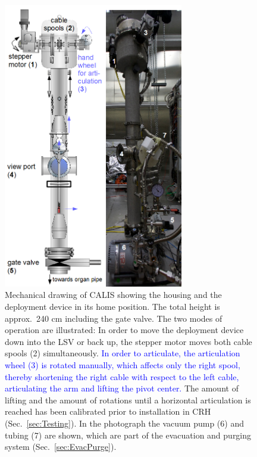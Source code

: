 \begin{figure}[htbp]
 \centering
\includegraphics[width=0.7\textwidth]{Figures/CALIS_overview.png}
 \caption{Mechanical drawing of CALIS showing the housing and the deployment device in its home position. The total height is approx.~240 cm including the gate valve. The two modes of operation are illustrated: In order to move the deployment device down into the LSV or back up, the stepper motor moves both cable spools (2) simultaneously. \textcolor{blue}{In order to articulate, the articulation wheel (3) is rotated manually, which affects only the right spool, thereby shortening the right cable with respect to the left cable, articulating the arm and lifting the pivot center.} The amount of lifting and the amount of rotations until a horizontal articulation is reached has been calibrated prior to installation in CRH (Sec.~\ref{sec:Testing}). In the photograph the vacuum pump (6) and tubing (7) are shown, which are part of the evacuation and purging system (Sec.~\ref{sec:EvacPurge}). \label{fig:CALISDimensions}\label{fig:CALISMechanism}\label{fig:gearDrawing}\label{fig:flushing_purging}
}
\end{figure}

